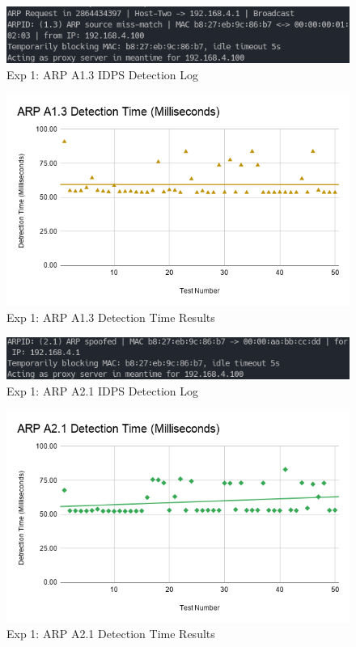 \documentclass[12pt, oneside]{book}
\begin{document}
\begin{figure}[H]
	\centering
	\includegraphics[scale=0.7]{../tests/a13/IDPSCap.png}
	\caption{Exp 1: ARP A1.3 IDPS Detection Log}
	\label{fig:arpa13l}
\end{figure}
\begin{figure}[H]
	\centering
	\includegraphics[scale=0.65]{../tests/aAll/ARP_A1.3_Detection_Time_(Milliseconds)_.png}
	\caption{Exp 1: ARP A1.3 Detection Time Results}
	\label{fig:arpa13g}
\end{figure}

\begin{figure}[H]
	\centering
	\includegraphics[scale=0.7]{../tests/a21/IDPSCap.png}
	\caption{Exp 1: ARP A2.1 IDPS Detection Log}
	\label{fig:arpa21l}
\end{figure}
\begin{figure}[H]
	\centering
	\includegraphics[scale=0.65]{../tests/aAll/ARP_A2.1_Detection_Time_(Milliseconds)_.png}
	\caption{Exp 1: ARP A2.1 Detection Time Results}
	\label{fig:arpa21g}
\end{figure}
\end{document}
